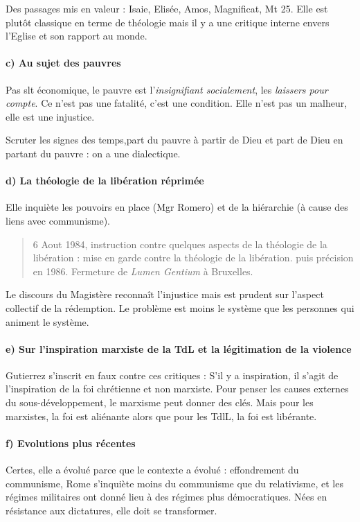 Des passages mis en valeur : Isaie, Elisée,
Amos, Magnificat, Mt 25.
Elle est plutôt classique en terme de théologie mais il y a une critique interne envers l'Eglise et son rapport au monde. 

\paragraph{c) Au sujet des pauvres}
Pas slt économique, le pauvre est l'\textit{insignifiant socialement}, les \textit{laissers pour compte}. Ce n'est pas une fatalité, c'est une condition. Elle n'est pas un malheur, elle est une injustice. 

Scruter les signes des temps,part du pauvre à partir de Dieu et part de Dieu en partant du pauvre : on a une dialectique.

\paragraph{d) La théologie de la libération réprimée}
Elle inquiète les pouvoirs en place (Mgr Romero) et de la hiérarchie (à cause des liens avec communisme). 

\begin{quote}
    6 Aout 1984, instruction contre quelques aspects de la théologie de la libération :
    mise en garde contre la théologie de la libération.
    puis précision en 1986. Fermeture de \textit{Lumen Gentium} à Bruxelles.
\end{quote}

Le discours du Magistère reconnaît l'injustice mais est prudent sur l'aspect collectif de la rédemption. Le problème est moins le système que les personnes qui animent le système.

\paragraph{e) Sur l’inspiration marxiste de la TdL et la légitimation de la violence}

Gutierrez s'inscrit en faux contre ces critiques : S'il y a inspiration, il s'agit de l'inspiration de la foi chrétienne et non marxiste.
Pour penser les causes externes du sous-développement, le marxisme peut donner des clés. 
Mais pour les marxistes, la foi est aliénante alors que pour les TdlL, la foi est libérante.




\paragraph{f) Evolutions plus récentes}
Certes, elle a évolué parce que le contexte a évolué : effondrement du communisme, Rome s'inquiète moins du communisme que du relativisme, et les régimes militaires ont donné lieu à des régimes plus démocratiques.  Nées en résistance aux dictatures, elle doit se transformer. 

